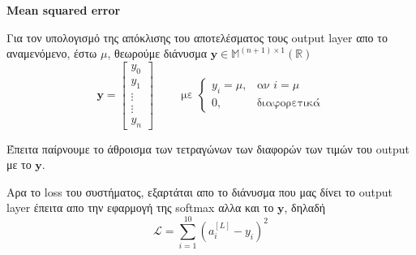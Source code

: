 \documentclass[a4paper,12pt]{article}
\begin{document}
\newpage

\section*{}
\begin{center}
    \Large \textbf{Mean squared error}
\end{center}

Για τον υπολογισμό της απόκλισης του αποτελέσματος τους output layer απο το αναμενόμενο, έστω $μ$, θεωρούμε διάνυσμα $\mathbf{y} \in \mathbb{M}^{(n+1)\times 1}(\mathbb{R})$
\[
\mathbf{y} =  \begin{bmatrix}
    y_0 \\
    y_1 \\
    \vdots \\
    \vdots \\
    y_{n}
\end{bmatrix} \hspace{1cm} \text{με } 
\begin{cases} 
y_i = μ, & \text{αν } i = μ \\
0, & \text{διαφορετικά}
\end{cases}
\]

Έπειτα παίρνουμε το άθροισμα των τετραγώνων των διαφορών των τιμών του output με το $\mathbf{y}$. 

Αρα το loss του συστήματος, εξαρτάται απο το διάνυσμα που μας δίνει το output layer έπειτα απο την εφαρμογή της softmax αλλα και το $\mathbf{y}$, δηλαδή
\[
\mathcal{L}= \sum_{i=1}^{10} (a_i^{[L]} - y_i)^2 
\]

\end{document}
